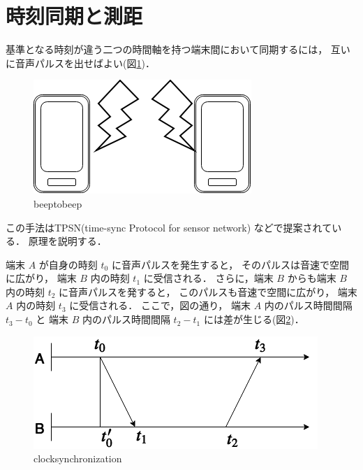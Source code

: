

\section{時刻同期と測距}

基準となる時刻が違う二つの時間軸を持つ端末間において同期するには，
互いに音声パルスを出せばよい(図\ref{fig:beeptobeep})．

\begin{figure}[p]\centering
  \hspace{-2mm}\includegraphics[clip,width=1.1\hsize]{img/beeptobeep.png}
  \caption{beeptobeep}\label{fig:beeptobeep}
\end{figure}

この手法はTPSN(time-sync Protocol for sensor network)\cite{tpsn}
などで提案されている．
原理を説明する．

端末 $A$ が自身の時刻 $t_0$ に音声パルスを発生すると，
そのパルスは音速で空間に広がり，
端末 $B$ 内の時刻 $t_1$ に受信される．
さらに，端末 $B$ からも端末 $B$ 内の時刻 $t_2$ に音声パルスを発すると，
このパルスも音速で空間に広がり，
端末 $A$ 内の時刻 $t_3$ に受信される．
ここで，図の通り，
端末 $A$ 内のパルス時間間隔 $t_3-t_0$ と
端末 $B$ 内のパルス時間間隔 $t_2-t_1$ には差が生じる(図\ref{fig:clocksynchronization})．

\begin{figure}[p]\centering
  \hspace{-2mm}\includegraphics[clip,width=1.1\hsize]{img/clock_synchronization.png}
  \caption{clocksynchronization}\label{fig:clocksynchronization}
\end{figure}

